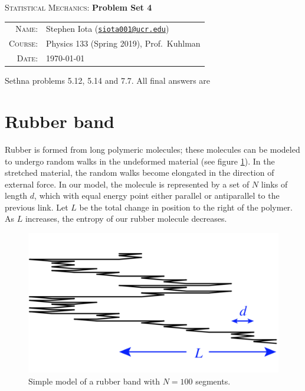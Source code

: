 \documentclass[11pt,letterpaper]{article}
\newcommand{\email}[1]{\texttt{\href{mailto:#1}{#1}}}
\numberwithin{equation}{section}
\numberwithin{figure}{section}
\begin{document}
\begin{center}
{\Large \textsc{Statistical Mechanics}: \textbf{Problem Set 4}}
\end{center}
\vspace{.5mm}

\begin{tabular}{rl}
\textsc{Name}:			&		Stephen Iota (\email{siota001@ucr.edu})
\\
\textsc{Course}:		&		Physics 133 (Spring 2019), Prof.~Kuhlman
\\
\textsc{Date}:			&		\today
\end{tabular}
\vspace{2mm}




\noindent
Sethna problems 5.12, 5.14 and 7.7. All final answers are 





\section{Rubber band}

Rubber is formed from long polymeric molecules; these molecules can be modeled to undergo random walks in the undeformed material (see figure \ref{fig:1}). In the stretched material, the random walks become elongated in the direction of external force. In our model, the molecule is represented by a set of $N$ links of length $d$, which with equal energy point either parallel or antiparallel to the previous link. Let $L$ be the total change in position to the right of the polymer. As $L$ increases, the entropy of our rubber molecule decreases.

\begin{figure}[h!]
\centering
\includegraphics[width=0.5\linewidth]{pset4_fig1}
\caption{Simple model of a rubber band with $N = 100$ segments.\label{fig:1}}
\end{figure}
\end{document}
